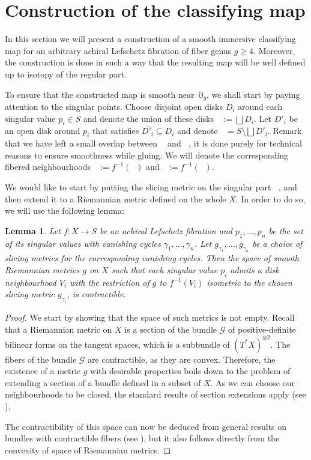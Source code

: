 \documentclass{article}
\DeclareMathOperator{\dm}{\overline{\mathcal{M}}}
\DeclareMathOperator{\sdiv}{\partial \dm}
\DeclareMathOperator{\xreg}{X_{\text{reg.}}}
\DeclareMathOperator{\xsing}{X_{\text{sing.}}}
\DeclareMathOperator{\sreg}{S_{\text{reg.}}}
\DeclareMathOperator{\ssing}{S_{\text{sing.}}}
\theoremstyle{plain}
\newtheorem{lem}{Lemma}[section]
\theoremstyle{remark}
\theoremstyle{definition}
\begin{document}
\section{Construction of the classifying map}
In this section we will present a construction of a smooth immersive classifying map for an arbitrary achiral Lefschetz fibration of fiber genus $g\geq 4$. Moreover, the construction is done in such a way that the resulting map will be well defined up to isotopy of the regular part. \par  %
To ensure that the constructed map is smooth near $\sdiv_g$, we shall start by paying attention to the singular points. Choose disjoint open disks $D_i$ around each singular value $p_i\in S$ and denote the union of these disks $\ssing := \bigsqcup D_i$. Let $D'_i$ be an open disk around $p_i$ that satisfies $\overline{D'_i}\subseteq D_i$ and denote $\sreg = S\setminus \bigsqcup D'_i$. Remark that we have left a small overlap between $\sreg$ and $\ssing$, it is done purely for technical reasons to ensure smoothness while gluing. We will denote the corresponding fibered neighbourhoods $\xsing := f^{-1}(\ssing)$ and $\xreg:=f^{-1}(\sreg)$. \par 
We would like to start by putting the slicing metric on the singular part $\xsing$, and then extend it to a Riemannian metric defined on the whole $X$. In order to do so, we will use the following lemma\thinspace:
\begin{lem}\label{slicing}
    Let $f:X\to S$ be an achiral Lefschetz fibration and $p_1,\dots,p_n$ be the set of its singular values with vanishing cycles $\gamma_1,\dots,\gamma_n$. Let $g_{\gamma_1},\dots,g_{\gamma_n}$ be a choice of slicing metrics for the corresponding vanishing cycles. Then the space of smooth Riemannian metrics $g$ on $X$ such that each singular value $p_i$ admits a disk neighbourhood $V_i$ with the restriction of $g$ to $f^{-1}(V_i)$ isometric to the chosen slicing metric $g_{\gamma_i}$, is contractible.
\end{lem}
\begin{proof}
    We start by showing that the space of such metrics is not empty. Recall that a Riemannian metric on $X$ is a section of the bundle $\mathcal{G}$ of positive-definite bilinear forms on the tangent spaces, which is a subbundle of $(T^*X)^{\otimes 2}$. The fibers of the bundle $\mathcal{G}$ are contractible, as they are convex. Therefore, the existence of a metric $g$ with desirable properties boils down to the problem of extending a section of a bundle defined in a subset of $X$. As we can choose our neighbourhoods to be closed, the standard results of section extensions apply (see \cite[Section 29]{Steenrod}). \par 
    The contractibility of this space can now be deduced from general results on bundles with contractible fibers (see \cite[Section 34]{Steenrod}), but it also follows directly from the convexity of space of Riemannian metrics.
\end{proof}
\end{document}
